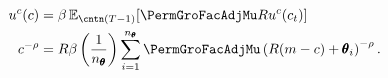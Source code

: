   \begin{equation}\begin{gathered}\begin{aligned}
        \uFunc^{c}(\cNrm)       & = \DiscFac \Ex_{\cntn(T-1)} [\PermGroFacAdjMu\Rfree \uFunc^{c}(c_{\prdT})]  %
        \\      \cNrm^{-\CRRA}   & = \Rfree \DiscFac \left(\frac{1}{n_{\TranShkEmp}}\right) \sum_{i=1}^{n_{\TranShkEmp}} \PermGroFacAdjMu\left(\Rfree (\mNrm-\cNrm) + \TranShkEmp_{i}\right)^{-\CRRA} \label{eq:FOCTm1}.
      \end{aligned}\end{gathered}\end{equation}
